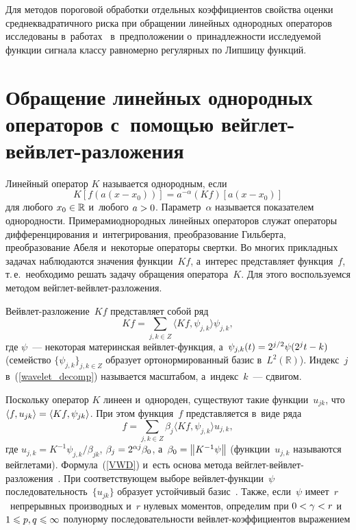 \begin{multicols}{2}
Для методов пороговой обработки отдельных коэффициентов свойства оценки 
среднеквадратичного риска при обращении линейных однородных операторов 
исследованы в~работах~\cite{KS11, SH12, SH16, SH18} в~предположении 
о~принадлежности исследуемой функции сигнала классу равномерно регулярных по 
Липшицу функций.

\vspace*{-6pt}

\section{Обращение линейных однородных операторов с~помощью вейг\-лет-вейв\-лет-разложения}

\vspace*{-3pt}

Линейный оператор $K$ называется однородным, если
$$
K[f(a(x-x_0))]=a^{-\alpha}(Kf)[a(x-x_0)]
$$
для любого $x_0\hm\in\mathbb{R}$ и~любого $a\hm>0$. Параметр~$\alpha$ называется 
показателем однородности. Примерами\linebreak однородных линейных операторов служат 
операторы дифференцирования и~интегрирования, преобразование Гильберта, 
преобразование Абеля и~некоторые операторы свертки. Во многих \mbox{прикладных} задачах 
наблюдаются значения функции~$Kf$, а~интерес представляет функция~$f$, т.\,е.\ 
необходимо решать задачу обращения оператора~$K$. Для этого воспользуемся 
методом вейг\-лет-вейв\-лет-раз\-ло\-же\-ния.

Вейвлет-разложение~$Kf$ представляет собой ряд
\begin{equation}
\label{wavelet_decomp}
Kf = \sum\limits_{j,k \in Z} \langle Kf,\psi_{j,k} \rangle \psi_{j,k},
\end{equation}
где $\psi$~--- некоторая материнская вейв\-лет-функ\-ция, а~$\psi_{j,k}(t) \hm= 
2^{j/2}\psi(2^jt - k)$ (семейство $\{\psi_{j,k}\}_{j,k \in Z}$ образует 
ортонормированный базис в~$L^2(\mathbb{R})$). Индекс~$j$ в~(\ref{wavelet_decomp}) называется масштабом, а~индекс~$k$~--- сдвигом.

Поскольку оператор $K$ линеен и~однороден, существуют такие функции~$u_{jk}$, 
что $\langle f,u_{jk}\rangle\hm=\langle Kf,\psi_{jk}\rangle$. При этом функция~$f$ 
представляется в~виде ряда
\begin{equation}
\label{VWD}
f = \sum_{j,k \in Z}\beta_{j}\langle Kf,\psi_{j,k}\rangle u_{j,k},
\end{equation}
где $u_{j,k} = K^{-1}\psi_{j,k} / \beta_{jk}$, $\beta_{j}\hm=2^{\alpha j}\beta_{0}$, а~$\beta_{0} \hm= \norm{K^{-1}\psi}$ 
(функции~$u_{j,k}$  называются 
вейглетами). Формула~(\ref{VWD}) и~есть основа метода вейг\-лет-вейв\-лет-раз\-ло\-же\-ния~\cite{AS98}. 
При соответствующем выборе вейв\-лет-функ\-ции~$\psi$ 
последовательность~$\{u_{jk}\}$ образует устойчивый базис~\cite{Lee97}. Также, 
если~$\psi$ имеет~$r$~непрерывных производных и~$r$ нулевых моментов, определим 
при $0\hm<\gamma\hm<r$ и~$1\hm\leqslant p,q\hm\leqslant\infty$ полунорму последовательности вейв\-лет-ко\-эф\-фи\-ци\-ен\-тов выражением


\end{multicols}
